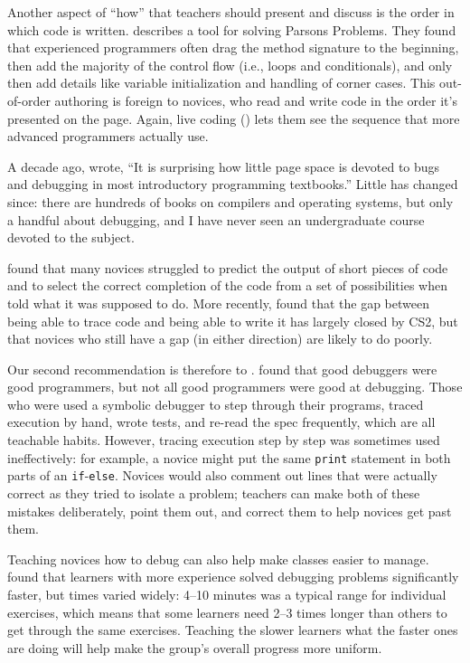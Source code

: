 Another aspect of ``how'' that teachers should present and discuss is the order in which code is written.
\cite{Ihan2011} describes a tool for solving Parsons Problems.
They found that experienced programmers often drag the method signature to the beginning,
then add the majority of the control flow (i.e., loops and conditionals),
and only then add details like variable initialization and handling of corner cases.
This out-of-order authoring is foreign to novices,
who read and write code in the order it's presented on the page.
Again,
live coding () lets them see the sequence
that more advanced programmers actually use.


A decade ago,
\cite{McCa2008} wrote,
``It is surprising how little page space is devoted to bugs and debugging
in most introductory programming textbooks.''
Little has changed since:
there are hundreds of books on compilers and operating systems,
but only a handful about debugging,
and I have never seen an undergraduate course devoted to the subject.

\cite{List2004,List2009} found that many novices struggled to predict the output of short pieces of code
and to select the correct completion of the code from a set of possibilities
when told what it was supposed to do.
More recently,
\cite{Harr2018} found that the gap between being able to trace code and being able to write it has largely closed by CS2,
but that novices who still have a gap (in either direction) are likely to do poorly.

Our second recommendation is therefore to .
\cite{Fitz2008,Murp2008} found that good debuggers were good programmers,
but not all good programmers were good at debugging.
Those who were used a symbolic debugger to step through their programs,
traced execution by hand,
wrote tests,
and re-read the spec frequently,
which are all teachable habits.
However, tracing execution step by step was sometimes used ineffectively:
for example,
a novice might put the same \texttt{print} statement in both parts of an \texttt{if}-\texttt{else}.
Novices would also comment out lines that were actually correct as they tried to isolate a problem;
teachers can make both of these mistakes deliberately,
point them out,
and correct them to help novices get past them.

Teaching novices how to debug can also help make classes easier to manage.
\cite{Alqa2017} found that learners with more experience solved debugging problems significantly faster,
but times varied widely:
4--10 minutes was a typical range for individual exercises,
which means that some learners need 2--3 times longer than others to get through the same exercises.
Teaching the slower learners what the faster ones are doing
will help make the group's overall progress more uniform.


